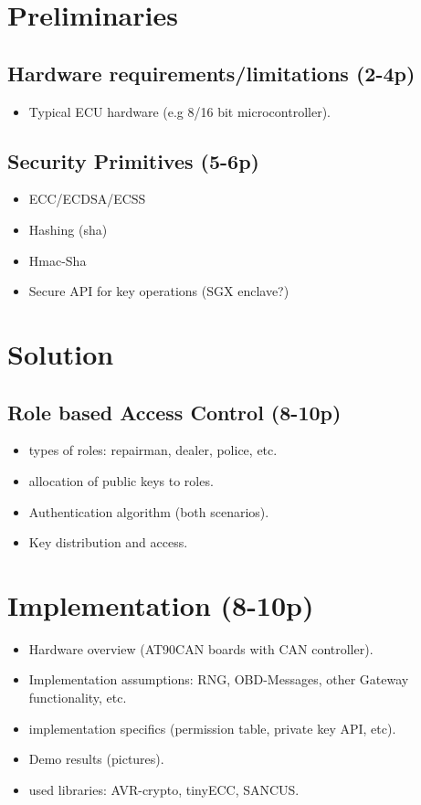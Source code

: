 \documentclass[11pt]{article}
\begin{document}
\section{Preliminaries}
\subsection{Hardware requirements/limitations (2-4p)}
\begin{itemize}
	\item Typical ECU hardware (e.g 8/16 bit microcontroller).
\end{itemize}

\subsection{Security Primitives (5-6p)}
\begin{itemize}
	\item ECC/ECDSA/ECSS
	\item Hashing (sha)
	\item Hmac-Sha 
	\item Secure API for key operations (SGX enclave?)
\end{itemize}

\section{Solution}
\subsection{Role based Access Control (8-10p)}
\begin{itemize}
	\item types of roles: repairman, dealer, police, etc.
	\item allocation of public keys to roles.
	\item Authentication algorithm (both scenarios).
	\item Key distribution and access.
\end{itemize}

\section{Implementation (8-10p)}
\begin{itemize}
	\item Hardware overview (AT90CAN boards with CAN controller).
	\item Implementation assumptions: RNG, OBD-Messages, other Gateway functionality, etc. 
	\item implementation specifics (permission table, private key API, etc).
	\item Demo results (pictures).
	\item used libraries: AVR-crypto, tinyECC, SANCUS.
\end{itemize}
\end{document}
